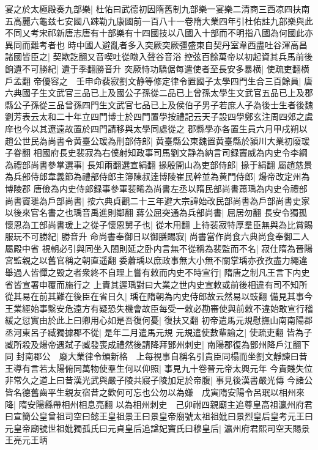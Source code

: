 宴之於太極殿奏九部樂|{
	杜佑曰武德初因隋舊制九部樂一宴樂二清商三西凉四扶南五高麗六龜兹七安國八踈勒九康國前一百八十一卷隋大業四年引杜佑註九部樂與此不同乂考宋祁新唐志唐有十部樂有十四國技以八國入十部而不明指八國為何國此亦異同而難考者也}
時中國人避亂者多入突厥突厥彊盛東自契丹室韋西盡吐谷渾高昌諸國皆臣之|{
	契欺訖翻又音喫吐從暾入聲谷音浴}
控弦百餘萬帝以初起資其兵馬前後餉遺不可勝紀|{
	遺于季翻勝音升}
突厥恃功驕倨每遣使者至長安多暴横|{
	使疏吏翻横戶孟翻}
帝優容之　壬申命裴寂劉文静等修定律令置國子太學四門生合三百餘員|{
	唐六典國子生文武官三品已上及國公子孫從二品已上曾孫太學生文武官五品已上及郡縣公子孫從三品曾孫四門生文武官七品已上及侯伯子男子若庶人子為後士生者後魏劉芳表云太和二十年立四門博士於四門置學按禮記云天子設四學鄭玄注周四郊之虞庠也今以其遼遠故置於四門請移與太學同處從之}
郡縣學亦各置生員六月甲戌朔以趙公世民為尚書令黄臺公瑗為刑部侍郎|{
	黄臺縣公東魏置黄臺縣於潁川大業初廢瑗子眷翻}
相國府長史裴寂為右僕射知政事司馬劉文静為納言司録竇威為内史令李綱為禮部尚書參掌選事|{
	長知兩翻選宣絹翻}
掾殷開山為吏部侍郎|{
	掾于絹翻}
屬趙慈景為兵部侍郎韋義節為禮部侍郎主簿陳叔逹博陵崔民幹並為黄門侍郎|{
	煬帝改定州為博陵郡}
唐儉為内史侍郎録事參軍裴晞為尚書左丞以隋民部尚書蕭瑀為内史令禮部尚書竇璡為戶部尚書|{
	按六典貞觀二十三年避大宗諱始改民部尚書為戶部尚書史家以後來官名書之也瑀音禹進則鄰翻}
蔣公屈突通為兵部尚書|{
	屈居勿翻}
長安令獨孤懷恩為工部尚書瑗上之從子懷恩舅子也|{
	從木用翻}
上待裴寂特厚羣臣無與為比賞賜服玩不可勝紀|{
	勝音升}
命尚書奉御日以御膳賜寂|{
	尚書當作尚食六典尚食奉御二人屬殿中省}
視朝必引與同坐入閤則延之卧内言無不從稱為裴監而不名|{
	寂仕隋為晉陽宮監親之以舊官稱之朝直遥翻}
委蕭瑀以庶政事無大小無不關掌瑀亦孜孜盡力繩違舉過人皆憚之毁之者衆終不自理上嘗有敕而内史不時宣行|{
	隋唐之制凡王言下内史省皆宣署申覆而施行之}
上責其遲瑀對曰大業之世内史宣敕或前後相違有司不知所從其易在前其難在後臣在省日久|{
	瑀在隋朝為内史侍郎故云然易以豉翻}
備見其事今王業經始事繫安危遠方有疑恐失機會故臣每受一敕必勘審使與前敕不違始敢宣行稽緩之愆實由於此上曰卿用心如是吾復何憂|{
	復扶又翻}
初帝遣馬元規慰撫山南南陽郡丞河東呂子臧獨據郡不從|{
	是年二月遣馬元規}
元規遣使數輩諭之|{
	使疏吏翻}
皆為子臧所殺及煬帝遇弑子臧發喪成禮然後請降拜鄧州刺史|{
	南陽郡復為鄧州降戶江翻下同}
封南郡公　廢大業律令頒新格　上每視事自稱名引貴臣同榻而坐劉文靜諫曰昔王導有言若太陽俯同萬物使羣生何以仰照|{
	事見九十卷晉元帝太興元年}
今貴賤失位非常久之道上曰昔漢光武與嚴子陵共寢子陵加足於帝腹|{
	事見後漢書嚴光傳}
今諸公皆名德舊齒平生親友宿昔之歡何可忘也公勿以為嫌　戊寅隋安陽令呂珉以相州來降|{
	隋安陽縣帶相州相息亮翻}
以為相州刺史　己卯祔四親廟主追尊皇高祖瀛州府君曰宣簡公皇曾祖司空曰懿王皇祖景王曰景皇帝廟號太祖祖妣曰景烈皇后皇考元王曰元皇帝廟號世祖妣獨孤氏曰元貞皇后追諡妃竇氏曰穆皇后|{
	瀛州府君熙司空天賜景王亮元王昞}
